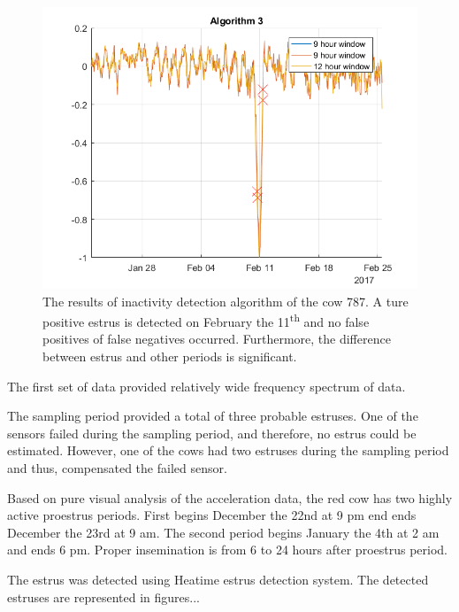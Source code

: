 \documentclass[english,12pt,a4paper,pdftex,elec,utf8]{aaltothesis}
\begin{document}
\begin{figure}[htb]
\centering
\includegraphics[width = 0.75 \textwidth]{figures/algorithm3_cow787.png}
\caption{The results of inactivity detection algorithm of the cow 787. A ture positive estrus is detected on February the 11\textsuperscript{th} and no false positives of false negatives occurred. Furthermore, the difference between estrus and other periods is significant.}
\end{figure}







The first set of data provided relatively wide frequency spectrum of data.



The sampling period provided a total of three probable estruses. One of the sensors failed during the sampling period, and therefore, no estrus could be estimated. However, one of the cows had two estruses during the sampling period and thus, compensated the failed sensor.

Based on pure visual analysis of the acceleration data, the red cow has two highly active proestrus periods. First begins December the 22nd at 9 pm end ends December the 23rd at 9 am. The second period begins January the 4th at 2 am and ends 6 pm. Proper insemination is from 6 to 24 hours after proestrus period.

The estrus was detected using Heatime estrus detection system. The detected estruses are represented in figures...

%
\end{document}
